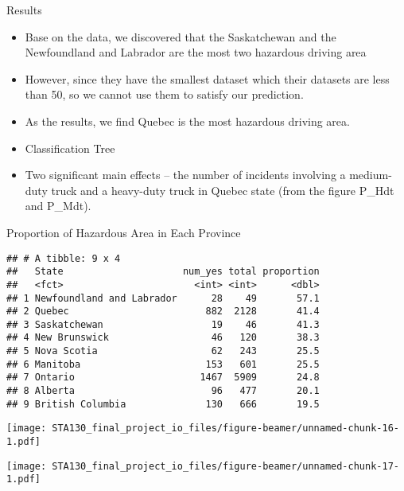 \documentclass[ignorenonframetext,]{beamer}
\providecommand{\tightlist}{%
  \setlength{\itemsep}{0pt}\setlength{\parskip}{0pt}}
\begin{document}
\begin{frame}{Results}

\begin{itemize}
\tightlist
\item
  Base on the data, we discovered that the Saskatchewan and the
  Newfoundland and Labrador are the most two hazardous driving area
\item
  However, since they have the smallest dataset which their datasets are
  less than 50, so we cannot use them to satisfy our prediction.
\item
  As the results, we find Quebec is the most hazardous driving area.
\item
  Classification Tree
\item
  Two significant main effects -- the number of incidents involving a
  medium-duty truck and a heavy-duty truck in Quebec state (from the
  figure P\_Hdt and P\_Mdt).
\end{itemize}

\end{frame}

\begin{frame}[fragile]{Proportion of Hazardous Area in Each Province}

\begin{verbatim}
## # A tibble: 9 x 4
##   State                     num_yes total proportion
##   <fct>                       <int> <int>      <dbl>
## 1 Newfoundland and Labrador      28    49       57.1
## 2 Quebec                        882  2128       41.4
## 3 Saskatchewan                   19    46       41.3
## 4 New Brunswick                  46   120       38.3
## 5 Nova Scotia                    62   243       25.5
## 6 Manitoba                      153   601       25.5
## 7 Ontario                      1467  5909       24.8
## 8 Alberta                        96   477       20.1
## 9 British Columbia              130   666       19.5
\end{verbatim}

\end{frame}

\begin{frame}

\texttt{[image: STA130\_final\_project\_io\_files/figure-beamer/unnamed-chunk-16-1.pdf]}

\end{frame}

\begin{frame}

\texttt{[image: STA130\_final\_project\_io\_files/figure-beamer/unnamed-chunk-17-1.pdf]}

\end{frame}
\end{document}
